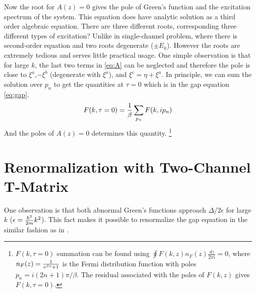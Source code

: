 Now the root for $A(z)=0$ gives the pole of Green's function and the excitation spectrum of the system.      This equation does have analytic solution as a third order algebraic equation. There are three different roots, corresponding three different types of excitation? Unlike in single-channel problem, where there is second-order equation and two roots degenerate ($\pm{E_k}$). However the roots are extremely tedious and serves little practical usage.  One simple observation is that for large $k$, the last two terms in \eqref{eq:A} can be neglected and therefore the pole is close to $\xi^a$,$-\xi^b$ (degenerate with $\xi^a$), and $\xi^c=\eta+\xi^a$.  In principle, we can sum the solution over $p_n$ to get the quantities at $\tau=0$ which is in the gap equation \eqref{eq:gap}. 
\[F(k,\tau=0)=\frac{1}{\beta}\sum_{p_n}F(k,ip_n)\] And the poles of $A(z)=0$ determines this quantity.
\footnote{
$F(k,\tau=0)$ summation can be found using $\oint{F(k,z)n_F(z)\frac{dz}{2\pi{i}}}=0$, where $n_F(z)=\frac{1}{e^{\beta{z}}+1}$ is the Fermi distribution function with poles $p_n=i(2n+1)\pi/\beta$. The residual associated with the poles of $F(k,z)$ gives $F(k,\tau=0)$.  
} 

\section{Renormalization with Two-Channel T-Matrix}
One observation is that both abnormal Green's functions approach ${\Delta}/{2\epsilon}$ for large $k$ ($\epsilon=\frac{\hbar^2}{2m}{k^2}$).  This fact makes it possible to renormalize the gap equation in the similar fashion as in \cite{Leggett}.  


